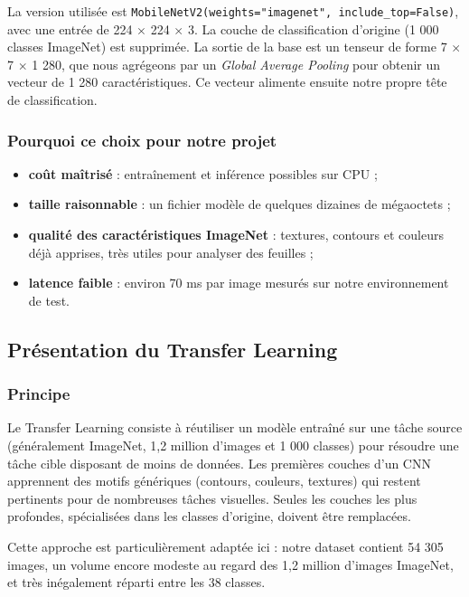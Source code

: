 \documentclass[10pt,a4paper]{article}
\begin{document}
La version utilisée est \texttt{MobileNetV2(weights="imagenet", include\_\allowbreak{}top=False)}, avec une entrée de 224 $\times$ 224 $\times$ 3. La couche de classification d'origine (1 000 classes ImageNet) est supprimée. La sortie de la base est un tenseur de forme 7 $\times$ 7 $\times$ 1 280, que nous agrégeons par un \emph{Global Average Pooling} pour obtenir un vecteur de 1 280 caractéristiques. Ce vecteur alimente ensuite notre propre tête de classification.

\subsubsection{Pourquoi ce choix pour notre projet}

\begin{itemize}
\item \textbf{coût maîtrisé} : entraînement et inférence possibles sur CPU ;
\item \textbf{taille raisonnable} : un fichier modèle de quelques dizaines de mégaoctets ;
\item \textbf{qualité des caractéristiques ImageNet} : textures, contours et couleurs déjà apprises, très utiles pour analyser des feuilles ;
\item \textbf{latence faible} : environ 70 ms par image mesurés sur notre environnement de test.
\end{itemize}

\subsection{Présentation du Transfer Learning}

\subsubsection{Principe}

Le Transfer Learning consiste à réutiliser un modèle entraîné sur une tâche source (généralement ImageNet, 1,2 million d'images et 1 000 classes) pour résoudre une tâche cible disposant de moins de données. Les premières couches d'un CNN apprennent des motifs génériques (contours, couleurs, textures) qui restent pertinents pour de nombreuses tâches visuelles. Seules les couches les plus profondes, spécialisées dans les classes d'origine, doivent être remplacées.

Cette approche est particulièrement adaptée ici : notre dataset contient 54 305 images, un volume encore modeste au regard des 1,2 million d'images ImageNet, et très inégalement réparti entre les 38 classes.
\end{document}
